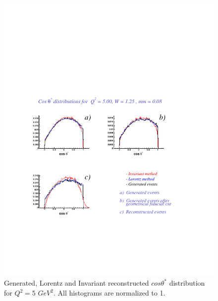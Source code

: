 \begin{figure}[h]
 \begin{center}
  \includegraphics[width = 12cm, bb = 60 140 540 540]{appendix/img/ctheta_q25.00_W1.25_mm0.08}
  \caption{Generated, Lorentz and Invariant reconstructed $cos\theta^*$ distribution for $Q^2=5$ $GeV^2$.
           All histograms are normalized to 1.}
 \end{center}
\end{figure} 
